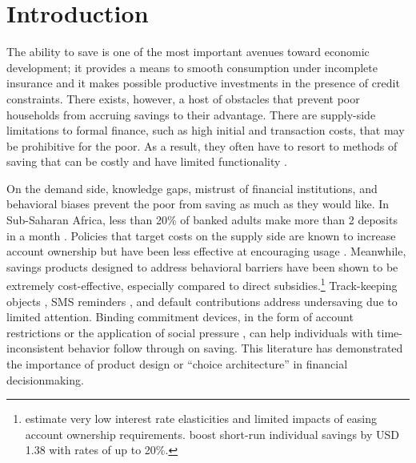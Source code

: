 \documentclass[11pt]{article}
\begin{document}
\newpage

\section{Introduction}

	The ability to save is one of the most important avenues toward economic development; it provides a means to smooth consumption under incomplete insurance and it makes possible productive investments in the presence of credit constraints. There exists, however, a host of obstacles that prevent poor households from accruing savings to their advantage. There are supply-side limitations to formal finance, such as high initial and transaction costs, that may be prohibitive for the poor. As a result, they often have to resort to methods of saving that can be costly and have limited functionality \parencite{collins_portfolios_2009,karlan_savings_2014,banerjee_economic_2007,schaner_cost_2017}. 

	On the demand side, knowledge gaps, mistrust of financial institutions, and behavioral biases prevent the poor from saving as much as they would like. In Sub-Saharan Africa, less than 20\% of banked adults make more than 2 deposits in a month \parencite{demirguc-kunt_global_2015}. Policies that target costs on the supply side are known to increase account ownership but have been less effective at encouraging usage \parencite{dupas_why_2013,karlan_banking_2016}. Meanwhile, savings products designed to address behavioral barriers have been shown to be extremely cost-effective, especially compared to direct subsidies.\footnote{\textcite{karlan_price_2018} estimate very low interest rate elasticities and limited impacts of easing account ownership requirements. \textcite{schaner_persistent_2018} boost short-run individual savings by USD 1.38 with rates of up to 20\%.} Track-keeping objects \parencite{akbas_how_2016}, SMS reminders \parencite{karlan_getting_2010}, and default contributions \parencite{thaler_save_2004,chetty_active_2014,somville_saving_2018} address undersaving due to limited attention. Binding commitment devices, in the form of account restrictions \parencite{ashraf_tying_2006} or the application of social pressure \parencite{dupas_why_2013}, can help individuals with time-inconsistent behavior follow through on saving. This literature has demonstrated the importance of product design or ``choice architecture'' in financial decisionmaking.

\end{document}
